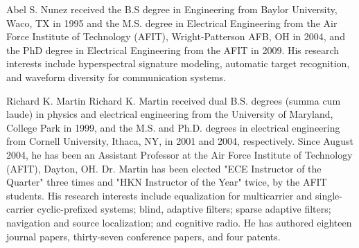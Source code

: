 \documentclass[10pt,journal,cspaper,compsoc]{IEEEtran}
\begin{document}
\begin{IEEEbiography} {Abel S. Nunez} %
received the B.S degree in Engineering from Baylor University, Waco, TX in 1995 and the M.S. degree in Electrical Engineering from the Air Force Institute 
of Technology (AFIT), Wright-Patterson AFB, OH in 2004, and the PhD degree in Electrical Engineering from the AFIT in 2009. His research interests 
include hyperspectral signature modeling, automatic target recognition, and waveform diversity for communication systems.
\end{IEEEbiography}

\begin{IEEEbiography}{Richard K. Martin} %
Richard K. Martin received dual B.S. degrees (summa cum laude) in physics and electrical engineering from the University of Maryland, 
College Park in 1999, and the M.S. and Ph.D. degrees in electrical engineering from Cornell University, Ithaca, NY, in 2001 and 2004, 
respectively. Since August 2004, he has been an Assistant Professor at the Air Force Institute of Technology (AFIT), Dayton, OH. 
Dr. Martin has been elected "ECE Instructor of the Quarter" three times and "HKN Instructor of the Year" twice, by the AFIT students.  
His research interests include equalization for multicarrier and single-carrier cyclic-prefixed systems; blind, adaptive filters; sparse
adaptive filters; navigation and source localization; and cognitive radio.  He has authored eighteen journal papers, thirty-seven 
conference papers, and four patents.
\end{IEEEbiography}
\end{document}
